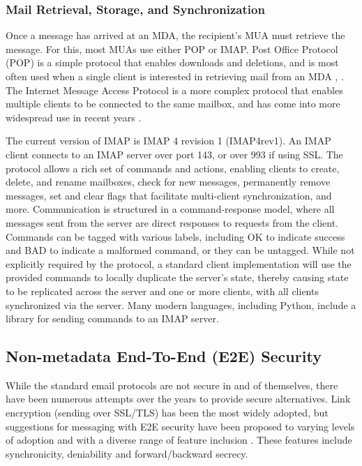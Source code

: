 \documentclass[pageno]{jpaper}
\begin{document}
\subsubsection{Mail Retrieval, Storage, and Synchronization}
\label{legacyimap}
Once a message has arrived at an MDA, the recipient's MUA must retrieve the message. For this, most MUAs use either POP or IMAP. Post Office Protocol (POP) is a simple protocol that enables downloads and deletions, and is most often used when a single client is interested in retrieving mail from an MDA \cite{reynolds1984post}, \cite{myers1996post}. The Internet Message Access Protocol is a more complex protocol that enables multiple clients to be connected to the same mailbox, and has come into more widespread use in recent years \cite{rfc3501}.

The current version of IMAP is IMAP 4 revision 1 (IMAP4rev1). An IMAP client connects to an IMAP server over port 143, or over 993 if using SSL. The protocol allows a rich set of commands and actions, enabling clients to create, delete, and rename mailboxes, check for new messages, permanently remove messages, set and clear flags that facilitate multi-client synchronization, and more. Communication is structured in a command-response model, where all messages sent from the server are direct responses to requests from the client. Commands can be tagged with various labels, including OK to indicate success and BAD to indicate a malformed command, or they can be untagged. While not explicitly required by the protocol, a standard client implementation will use the provided commands to locally duplicate the server's state, thereby causing state to be replicated across the server and one or more clients, with all clients synchronized via the server. Many modern languages, including Python, include a library for sending commands to an IMAP server.

\subsection{Non-metadata End-To-End (E2E) Security}
While the standard email protocols are not secure in and of themselves, there have been numerous attempts over the years to provide secure alternatives. Link encryption (sending over SSL/TLS) has been the most widely adopted, but suggestions for messaging with E2E security have been proposed to varying levels of adoption and with a diverse range of feature inclusion \cite{unger2015sok}. These features include synchronicity, deniability and forward/backward secrecy.
\end{document}

